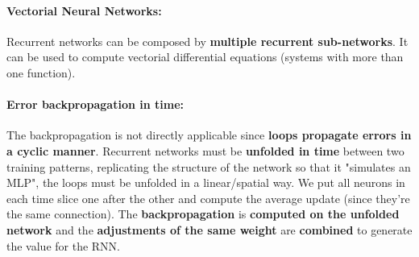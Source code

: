 \paragraph{Vectorial Neural Networks:} Recurrent networks can be composed by \textbf{multiple recurrent sub-networks}. It can be used to compute vectorial differential equations (systems with more than one function).

\paragraph{Error backpropagation in time:}  The backpropagation is not directly applicable since \textbf{loops propagate errors in a cyclic manner}. Recurrent networks must be \textbf{unfolded in time} between two training patterns, replicating the structure of the network so that it "simulates an MLP", the loops must be unfolded in a linear/spatial way. We put all neurons in each time slice one after the other and compute the average update (since they're the same connection). The \textbf{backpropagation} is \textbf{computed on the unfolded network} and the \textbf{adjustments of the same weight} are \textbf{combined} to generate the value for the RNN.\\

\newpage


